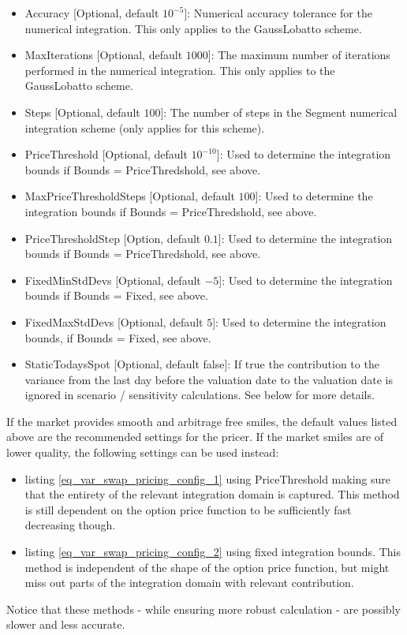 \begin{itemize}
\item Accuracy [Optional, default $10^{-5}$]: Numerical accuracy tolerance for the numerical integration. This only
  applies to the GaussLobatto scheme.
\item MaxIterations [Optional, default $1000$]: The maximum number of iterations performed in the numerical
  integration. This only applies to the GaussLobatto scheme.
\item Steps [Optional, default $100$]: The number of steps in the Segment numerical integration scheme (only applies for
  this scheme).
\item PriceThreshold [Optional, default $10^{-10}$]: Used to determine the integration bounds if Bounds = PriceThredshold, see above.
\item MaxPriceThresholdSteps [Optional, default $100$]: Used to determine the integration bounds if Bounds = PriceThredshold, see above.
\item PriceThresholdStep [Option, default $0.1$]: Used to determine the integration bounds if Bounds = PriceThredshold, see above.
\item FixedMinStdDevs [Optional, default $-5$]: Used to determine the integration bounds if Bounds = Fixed, see above.
\item FixedMaxStdDevs [Optional, default $5$]: Used to determine the integration bounds, if Bounds = Fixed, see above.
\item StaticTodaysSpot [Optional, default false]: If true the contribution to the variance from the last day before the
  valuation date to the valuation date is ignored in scenario / sensitivity calculations. See below for more details.
\end{itemize}

If the market provides smooth and arbitrage free smiles, the default values listed above are the recommended settings
for the pricer. If the market smiles are of lower quality, the following settings can be used instead:
\begin{itemize}
\item listing \ref{eq_var_swap_pricing_config_1} using PriceThreshold making sure that the entirety of the relevant
  integration domain is captured. This method is still dependent on the option price function to be sufficiently fast
  decreasing though.
\item listing \ref{eq_var_swap_pricing_config_2} using fixed integration bounds. This method is independent of the shape
  of the option price function, but might miss out parts of the integration domain with relevant contribution.
\end{itemize}
Notice that these methods - while ensuring more robust calculation - are possibly slower and less accurate.

